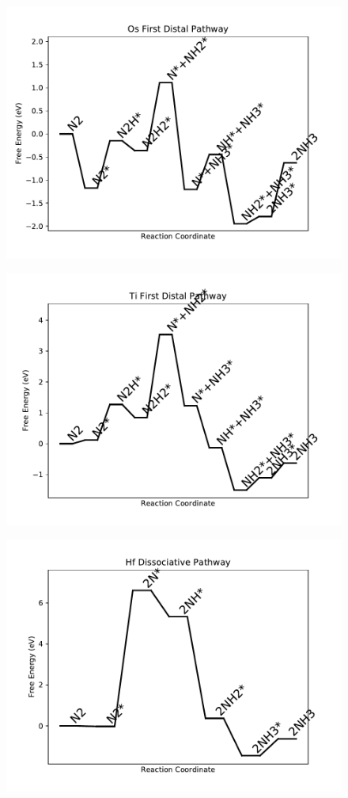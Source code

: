 \begin{figure}
\includegraphics[width=0.8\linewidth]{data/plots/Os_distal_1.pdf}
\end{figure}

\begin{figure}
\includegraphics[width=0.8\linewidth]{data/plots/Ti_distal_1.pdf}
\end{figure}

\begin{figure}
\includegraphics[width=0.8\linewidth]{data/plots/Hf_dissociative.pdf}
\end{figure}


